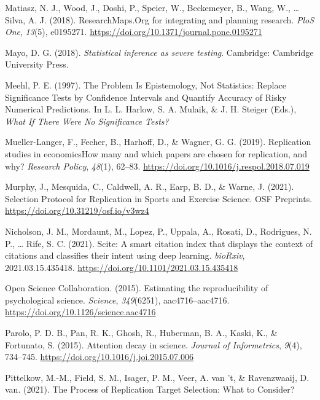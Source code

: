\documentclass[
  english,
  jou,floatsintext]{apa6}
\newlength{\cslhangindent}
\newenvironment{cslreferences}%
  {\setlength{\parindent}{0pt}%
  \everypar{\setlength{\hangindent}{\cslhangindent}}\ignorespaces}%
  {\par}
\begin{document}
\begin{cslreferences}
\leavevmode\hypertarget{ref-Matiasz2018}{}%
Matiasz, N. J., Wood, J., Doshi, P., Speier, W., Beckemeyer, B., Wang, W., \ldots{} Silva, A. J. (2018). ResearchMaps.Org for integrating and planning research. \emph{PloS One}, \emph{13}(5), e0195271. \url{https://doi.org/10.1371/journal.pone.0195271}

\leavevmode\hypertarget{ref-Mayo2018}{}%
Mayo, D. G. (2018). \emph{Statistical inference as severe testing}. Cambridge: Cambridge University Press.

\leavevmode\hypertarget{ref-Meehl1997}{}%
Meehl, P. E. (1997). The Problem Is Epistemology, Not Statistics: Replace Significance Tests by Confidence Intervals and Quantify Accuracy of Risky Numerical Predictions. In L. L. Harlow, S. A. Mulaik, \& J. H. Steiger (Eds.), \emph{What If There Were No Significance Tests?}

\leavevmode\hypertarget{ref-Mueller-Langer2019}{}%
Mueller-Langer, F., Fecher, B., Harhoff, D., \& Wagner, G. G. (2019). Replication studies in economicsHow many and which papers are chosen for replication, and why? \emph{Research Policy}, \emph{48}(1), 62--83. \url{https://doi.org/10.1016/j.respol.2018.07.019}

\leavevmode\hypertarget{ref-Murphy2021}{}%
Murphy, J., Mesquida, C., Caldwell, A. R., Earp, B. D., \& Warne, J. (2021). Selection Protocol for Replication in Sports and Exercise Science. OSF Preprints. \url{https://doi.org/10.31219/osf.io/v3wz4}

\leavevmode\hypertarget{ref-Nicholson2021}{}%
Nicholson, J. M., Mordaunt, M., Lopez, P., Uppala, A., Rosati, D., Rodrigues, N. P., \ldots{} Rife, S. C. (2021). Scite: A smart citation index that displays the context of citations and classifies their intent using deep learning. \emph{bioRxiv}, 2021.03.15.435418. \url{https://doi.org/10.1101/2021.03.15.435418}

\leavevmode\hypertarget{ref-OpenScienceCollaboration2015}{}%
Open Science Collaboration. (2015). Estimating the reproducibility of psychological science. \emph{Science}, \emph{349}(6251), aac4716--aac4716. \url{https://doi.org/10.1126/science.aac4716}

\leavevmode\hypertarget{ref-Parolo2015}{}%
Parolo, P. D. B., Pan, R. K., Ghosh, R., Huberman, B. A., Kaski, K., \& Fortunato, S. (2015). Attention decay in science. \emph{Journal of Informetrics}, \emph{9}(4), 734--745. \url{https://doi.org/10.1016/j.joi.2015.07.006}

\leavevmode\hypertarget{ref-Pittelkow2021}{}%
Pittelkow, M.-M., Field, S. M., Isager, P. M., Veer, A. van 't, \& Ravenzwaaij, D. van. (2021). The Process of Replication Target Selection: What to Consider?


\end{cslreferences}
\end{document}
